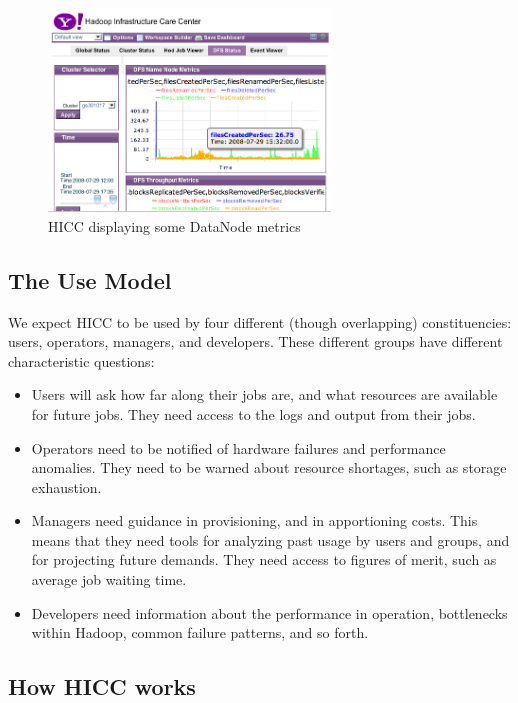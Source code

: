 \documentclass[letterpaper,twocolumn,10pt]{article}
\begin{document}
\begin{figure}
\includegraphics[width=75mm]{hicc_in_action2.png}
\caption{HICC displaying some DataNode metrics}
\end{figure}

\subsection{The Use Model}

We expect HICC to be used by four different (though overlapping) constituencies:   users, operators, managers, and developers.  These different groups have different characteristic questions:


\begin{itemize}
\item Users will ask how far along their jobs are, and what resources are available for future jobs. They need access to the logs and output from their jobs.  

\item Operators need to be notified of hardware failures and performance anomalies. They need to be warned about resource shortages, such as storage exhaustion.  

\item Managers need guidance in provisioning, and in apportioning costs. This means that they need tools for analyzing past usage by users and groups, and for projecting future demands.   They need access to figures of merit, such as average job waiting time.

\item Developers need information about the performance in operation, bottlenecks within Hadoop, common failure patterns, and so forth.

\end{itemize}

\subsection{How HICC works}
\end{document}
